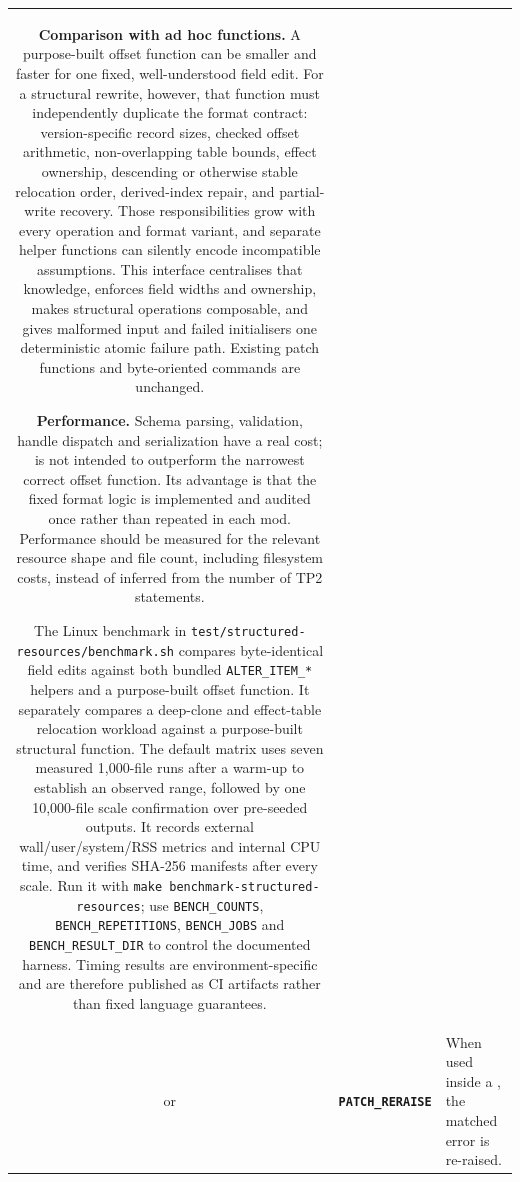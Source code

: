 \documentclass{article}
\def\ttref#1{\ahrefloc{#1}{\tt #1}}
\def\DEFINE#1{{\tt \bf #1}\label{#1}\index{#1}}
\def\t#1{{\tt #1}}
\begin{document}
\begin{tabular}{cp{10in}|p{10in}}
    \textbf{Comparison with ad hoc functions.} A purpose-built offset function
    can be smaller and faster for one fixed, well-understood field edit. For a
    structural rewrite, however, that function must independently duplicate
    the format contract: version-specific record sizes, checked offset
    arithmetic, non-overlapping table bounds, effect ownership, descending or
    otherwise stable relocation order, derived-index repair, and partial-write
    recovery. Those responsibilities grow with every operation and format
    variant, and separate helper functions can silently encode incompatible
    assumptions. This interface centralises that knowledge, enforces field
    widths and ownership, makes structural operations composable, and gives
    malformed input and failed initialisers one deterministic atomic failure
    path. Existing patch functions and byte-oriented commands are unchanged.

    \textbf{Performance.} Schema parsing, validation, handle dispatch and
    serialization have a real cost; \ttref{PATCH_RESOURCE} is not intended to
    outperform the narrowest correct offset function. Its advantage is that
    the fixed format logic is implemented and audited once rather than repeated
    in each mod. Performance should be measured for the relevant resource
    shape and file count, including filesystem costs, instead of inferred from
    the number of TP2 statements.

    The Linux benchmark in \t{test/structured-resources/benchmark.sh} compares
    byte-identical field edits against both bundled \t{ALTER_ITEM_*} helpers
    and a purpose-built offset function. It separately compares a deep-clone
    and effect-table relocation workload against a purpose-built structural
    function. The default matrix uses seven measured 1,000-file runs after a
    warm-up to establish an observed range, followed by one 10,000-file scale
    confirmation over pre-seeded outputs. It records external
    wall/user/system/RSS metrics and internal \ttref{PATCH_TIME} CPU time, and
    verifies SHA-256 manifests after every scale. Run it with
    \t{make benchmark-structured-resources}; use
    \t{BENCH_COUNTS}, \t{BENCH_REPETITIONS}, \t{BENCH_JOBS} and
    \t{BENCH_RESULT_DIR} to control the documented harness. Timing results are
    environment-specific and are therefore published as CI artifacts rather
    than fixed language guarantees.
  \\

  or & \DEFINE{PATCH_RERAISE} &
     When used inside a \ttref{PATCH_TRY}, the matched error is re-raised.


\end{tabular}
\end{document}
